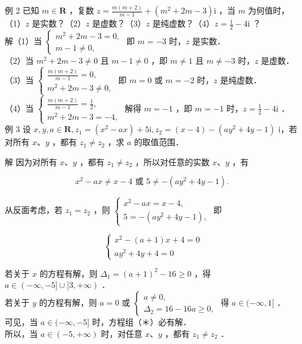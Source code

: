 \documentclass[10pt]{article}
\begin{document}
例 2 已知 \(m \in \mathbf{R}\) ，复数 \(z=\frac{m(m+2)}{m-1}+\left(m^{2}+2 m-3\right) \mathrm{i}\) ，当 \(m\) 为何值时，\\
（1）\(z\) 是实数？（2）\(z\) 是虚数？（3）\(z\) 是纯虚数？（4）\(z=\frac{1}{2}-4 \mathrm{i}\) ？\\
解（1）当 \(\left\{\begin{array}{l}m^{2}+2 m-3=0, \\ m-1 \neq 0,\end{array}\right.\) 即 \(m=-3\) 时，\(z\) 是实数．\\
（2）当 \(m^{2}+2 m-3 \neq 0\) 且 \(m-1 \neq 0\) ，即 \(m \neq 1\) 且 \(m \neq-3\) 时，\(z\) 是虚数．\\
（3）当 \(\left\{\begin{array}{l}\frac{m(m+2)}{m-1}=0, \\ m^{2}+2 m-3 \neq 0,\end{array}\right.\) 即 \(m=0\) 或 \(m=-2\) 时，\(z\) 是纯虚数．\\
（4）当 \(\left\{\begin{array}{l}\frac{m(m+2)}{m-1}=\frac{1}{2}, \\ m^{2}+2 m-3=-4,\end{array}\right.\) 解得 \(m=-1\) ，即 \(m=-1\) 时，\(z=\frac{1}{2}-4 \mathrm{i}\) ．\\
例 3 设 \(x, y, a \in \mathbf{R}, z_{1}=\left(x^{2}-a x\right)+5 \mathrm{i}, z_{2}=(x-4)-\left(a y^{2}+4 y-1\right)\) i，若对所有 \(x 、 y\) ，都有 \(z_{1} \neq z_{2}\) ，求 \(a\) 的取值范围．

解 因为对所有 \(x 、 y\) ，都有 \(z_{1} \neq z_{2}\) ，所以对任意的实数 \(x 、 y\) ，有

\[
x^{2}-a x \neq x-4 \text { 或 } 5 \neq-\left(a y^{2}+4 y-1\right) \text {. }
\]

从反面考虑，若 \(z_{1}=z_{2}\) ，则 \(\left\{\begin{array}{l}x^{2}-a x=x-4, \\ 5=-\left(a y^{2}+4 y-1\right),\end{array}\right.\) 即

\[
\left\{\begin{array}{l}
x^{2}-(a+1) x+4=0 \\
a y^{2}+4 y+4=0
\end{array}\right.
\]

若关于 \(x\) 的方程有解，则 \(\Delta_{1}=(a+1)^{2}-16 \geqslant 0\) ，得 \(a \in(-\infty,-5] \cup[3,+\infty)\) ．\\
若关于 \(y\) 的方程有解，则 \(a=0\) 或 \(\left\{\begin{array}{l}a \neq 0, \\ \Delta_{2}=16-16 a \geqslant 0,\end{array}\right.\) 得 \(a \in(-\infty, 1]\) ．\\
可见，当 \(a \in(-\infty,-5]\) 时，方程组（＊）必有解．\\
所以，当 \(a \in(-5,+\infty)\) 时，对任意 \(x 、 y\) ，都有 \(z_{1} \neq z_{2}\) ．
\end{document}
